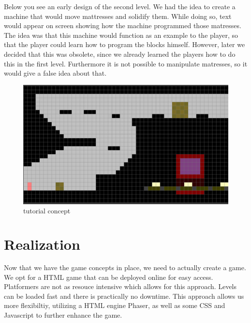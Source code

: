 \documentclass[a4paper,twoside,12pt]{article}
\begin{document}
Below you see an early design of the second level. We had the idea to create a machine that would move mattresses and solidify them. While doing so, text would appear on screen showing how the machine programmed those matresses. The idea was that this machine would function as an example to the player, so that the player could learn how to program the blocks himself. However, later we decided that this was obsolete, since we already learned the players how to do this in the first level. Furthermore it is not possible to manipulate matresses, so it would give a false idea about that.

\begin{figure}[H]
\includegraphics[scale=0.5]{level.png}
\caption{tutorial concept}
\end{figure}

\section{Realization}
Now that we have the game concepts in place, we need to actually create a game.
We opt for a HTML game that can be deployed online for easy access. Platformers are not as resouce intensive which allows for this approach. Levels can be loaded fast and there is practically no downtime. This approach allows us more flexibiltiy, utilizing a HTML engine Phaser, as well as some CSS and Javascript to further enhance the game.
\end{document}
